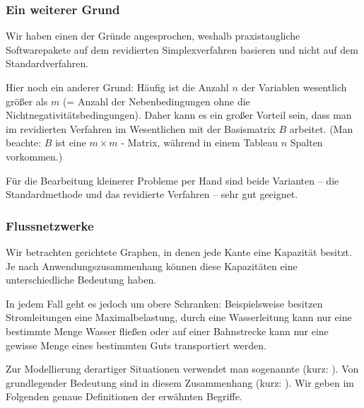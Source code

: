 \documentclass[smaller]{beamer}
\begin{document}
\begin{frame}
 \frametitle{Ein weiterer Grund}
Wir haben einen der Gründe angesprochen, weshalb praxistaugliche Softwarepakete auf dem revidierten Simplexverfahren basieren  und nicht auf dem Standardverfahren. \\ \vspace*{0.2cm}

Hier noch ein anderer Grund: \alert{Häufig ist die Anzahl $n$ der Variablen wesentlich größer als $m$} (= Anzahl der Nebenbedingungen ohne die Nichtnegativitätsbedingungen). Daher kann es ein großer Vorteil sein, dass man im revidierten Verfahren im Wesentlichen mit der Basismatrix $B$ arbeitet. (Man beachte: $B$ ist eine $m \times m$ - Matrix, während in einem Tableau $n$ Spalten vorkommen.) \\ \vspace*{0.2cm}

\alert{Für die Bearbeitung kleinerer Probleme per Hand sind beide Varianten -- die Standardmethode und das revidierte Verfahren -- sehr gut geeignet}.
\end{frame}

\begin{frame}
 \frametitle{Flussnetzwerke}
 Wir betrachten gerichtete Graphen, in denen jede Kante eine {\glqq}Kapazität{\grqq} besitzt. Je nach Anwendungszusammenhang können diese Kapazitäten eine unterschiedliche Bedeutung haben. \\ \vspace*{0.2cm} 
 
 In jedem Fall geht es jedoch um \alert{obere Schranken:} Beispielsweise besitzen Stromleitungen eine Maximalbelastung, durch eine Wasserleitung kann nur eine bestimmte Menge Wasser fließen oder auf einer Bahnstrecke kann nur eine gewisse Menge eines bestimmten Guts transportiert werden. \\ \vspace*{0.2cm}
 
 Zur Modellierung derartiger Situationen verwendet man sogenannte  (kurz: ). Von grundlegender Bedeutung sind in diesem Zusammenhang  (kurz: ). Wir geben im Folgenden genaue Definitionen der erwähnten Begriffe. 
\end{frame}
\end{document}

